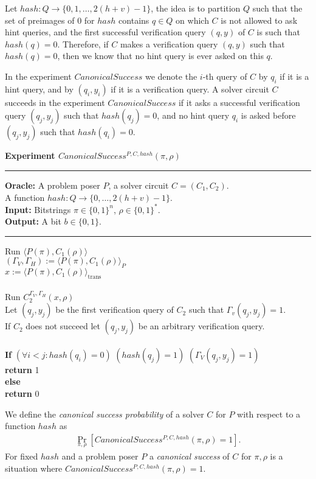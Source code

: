 
Let $hash:Q\rightarrow\{0,1,\dots, 2(h+v)-1\}$,
the idea is to partition $Q$ such that the set of preimages of $0$ for $hash$ contains $q \in Q$ on which $C$ is not allowed to ask hint queries,
and the first successful verification query $(q,y)$ of $C$ is such that $hash(q) = 0$.
Therefore, if $C$ makes a verification query $(q,y)$ such that $hash(q) = 0$, then we know that no hint query is ever asked on this $q$.

In the experiment $CanonicalSuccess$ we denote the $i$-th query of $C$ by $q_i$ if it is a hint query, and by $(q_i, y_i)$ if it is a verification query.
A solver circuit $C$ succeeds in the experiment $CanonicalSuccess$ if it asks a successful verification query $(q_j, y_j)$ such that $hash(q_j) = 0$,
and no hint query $q_i$ is asked before $(q_j, y_j)$ such that $hash(q_i) = 0$.
%
\begin{codeblock}
  \textbf{Experiment $CanonicalSuccess^{P, C, hash}(\pi, \rho)$}
  \medskip
  \hrule
  \medskip
  \textbf{Oracle:} A problem poser $P$, a solver circuit $C = (C_1, C_2)$.\\
  \IndII A function $hash: Q \rightarrow \{0, \dots, 2(h+v) - 1\}$.\\
  \textbf{Input:}  Bitstrings $\pi \in \{0,1\}^n$, $\rho \in \{0,1\}^*$. \\
  \textbf{Output:} A bit $b \in \{0,1\}$.

  \medskip\hrule\medskip
  Run $\langle P(\pi), C_1(\rho) \rangle$ \\
  \IndI $(\Gamma_V, \Gamma_H) := \langle P(\pi), C_1(\rho) \rangle_{P}$ \\
  \IndI $x := \langle P(\pi), C_1(\rho) \rangle_{\text{trans}}$ \\ \\
  Run $C_2^{\Gamma_V, \Gamma_H} (x, \rho)$ \\
  \IndI Let $(q_j,y_j)$ be the first verification query of $C_2$ such that $\Gamma_v(q_j, y_j) = 1$.\\
  \IndI If $C_2$ does not succeed let $(q_j, y_j)$ be an arbitrary verification query.\\
  \\
  \textbf{If} $(\forall i < j :  hash(q_i) = 0)$ \And $(hash(q_j) = 1)$ \And $(\Gamma_V(q_j, y_j) = 1)$ \then \\
  \IndI \textbf{return} 1\\
  \textbf{else}\\
  \IndI \textbf{return} 0
\end{codeblock}
%
We define the \textit{canonical success probability} of a solver $C$ for $P$ with respect to a function $hash$ as
\begin{align}
 \underset{\pi, \rho}{\Pr}[CanonicalSuccess^{P, C, hash}(\pi, \rho) = 1].
\end{align}
%
For fixed $hash$ and a problem poser $P$ a \textit{canonical success} of $C$ for $\pi, \rho$ is a situation where $CanonicalSuccess^{P, C, hash}(\pi, \rho) = 1$.

